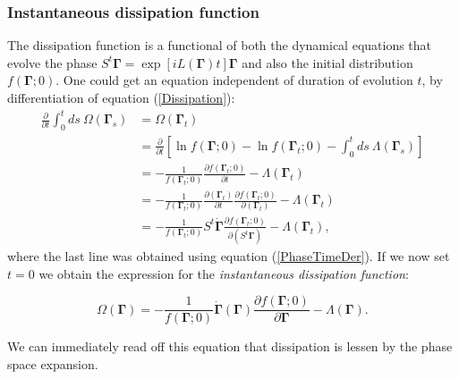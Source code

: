 \documentclass[a4paper,12pt]{article}
\begin{document}

\subsubsection{Instantaneous dissipation function}

The dissipation function is a functional of both the dynamical equations that evolve the phase $S^t \bm{\Gamma} = \exp[iL(\bm{\Gamma})t]\bm{\Gamma}$ and also the initial distribution $f(\bm{\Gamma};0)$.
One could get an equation independent of duration of evolution $t$, by differentiation of equation (\ref{Dissipation}):
\begin{equation}
\begin{aligned}
  \frac{\partial}{\partial t}\int_0^t ds\ \Omega(\bm{\Gamma}_s) &= \Omega(\bm{\Gamma}_t)\\
  &=\frac{\partial}{\partial t}[\ln{f(\bm{\Gamma};0)}-\ln{f(\bm{\Gamma}_t;0)}
-\int_0^t ds \ \Lambda(\bm{\Gamma}_s)
]\\
&=-\frac{1}{f(\bm{\Gamma}_t;0)}\frac{\partial f(\bm{\Gamma}_t;0)}{\partial t}-\Lambda( \bm{\Gamma}_t)\\
&=-\frac{1}{f(\bm{\Gamma}_t;0)}\frac{\partial(  \bm{\Gamma}_t)}{\partial t}\frac{\partial f(\bm{\Gamma}_t;0)}{\partial(\bm{\Gamma}_t)}-\Lambda(\bm{\Gamma}_t)\\
&=-\frac{1}{f(\bm{\Gamma}_t;0)}S^t\dot{\bm{\Gamma}}
\frac{\partial f(\bm{\Gamma}_t;0)}{\partial(S^t \bm{\Gamma})}-\Lambda( \bm{\Gamma}_t),
\end{aligned}
\end{equation}
where the last line was obtained using equation (\ref{PhaseTimeDer}). 
If we now set $t=0$ we obtain the expression for the \textit{instantaneous dissipation function}:

\begin{equation}
  \Omega(\bm{\Gamma})=-\frac{1}{f(\bm{\Gamma};0)}\dot{\bm{\Gamma}}(\bm{\Gamma})\frac{\partial{f(\bm{\Gamma};0)}}{\partial{\bm{\Gamma}}}-\Lambda(\bm{\Gamma}).
\end{equation}

We can immediately read off this equation that dissipation is lessen by the phase space expansion. 

\end{document}
